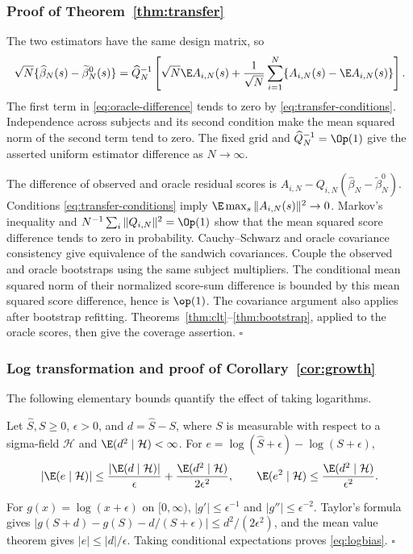 \subsubsection*{Proof of Theorem~\ref{thm:transfer}}
The two estimators have the same design matrix, so
\begin{equation}\label{eq:oracle-difference}
 \sqrt N\{\widehat\beta_N(s)-\widetilde\beta_N^0(s)\}
 =\widehat Q_N^{-1}\left[
 \sqrt N\E A_{i,N}(s)+\frac1{\sqrt N}
 \sum_{i=1}^N\{A_{i,N}(s)-\E A_{i,N}(s)\}\right].
\end{equation}
The first term in \eqref{eq:oracle-difference} tends to zero by \eqref{eq:transfer-conditions}. Independence across subjects and its second condition make the mean squared norm of the second term tend to zero. The fixed grid and $\widehat Q_N^{-1}=\Op(1)$ give the asserted uniform estimator difference as $N\to\infty$.

The difference of observed and oracle residual scores is $A_{i,N}-Q_{i,N}(\widehat\beta_N-\widetilde\beta_N^0)$. Conditions \eqref{eq:transfer-conditions} imply $\E\max_s\|A_{i,N}(s)\|^2\to0$. Markov's inequality and $N^{-1}\sum_i\|Q_{i,N}\|^2=\Op(1)$ show that the mean squared score difference tends to zero in probability. Cauchy--Schwarz and oracle covariance consistency give equivalence of the sandwich covariances. Couple the observed and oracle bootstraps using the same subject multipliers. The conditional mean squared norm of their normalized score-sum difference is bounded by this mean squared score difference, hence is $\op(1)$. The covariance argument also applies after bootstrap refitting. Theorems~\ref{thm:clt}--\ref{thm:bootstrap}, applied to the oracle scores, then give the coverage assertion. \hfill$\square$

\subsubsection*{Log transformation and proof of Corollary~\ref{cor:growth}}
The following elementary bounds quantify the effect of taking logarithms.

\begin{lemma}\label{lem:logbias}
Let $\widehat S,S\geq0$, $\epsilon>0$, and $d=\widehat S-S$, where $S$ is measurable with respect to a sigma-field $\mathcal H$ and $\E(d^2\mid\mathcal H)<\infty$. For $e=\log(\widehat S+\epsilon)-\log(S+\epsilon)$,
\begin{equation}\label{eq:logbias}
 |\E(e\mid\mathcal H)|
 \leq\frac{|\E(d\mid\mathcal H)|}{\epsilon}
       +\frac{\E(d^2\mid\mathcal H)}{2\epsilon^2},
 \qquad
 \E(e^2\mid\mathcal H)\leq\frac{\E(d^2\mid\mathcal H)}{\epsilon^2}.
\end{equation}
\end{lemma}
For $g(x)=\log(x+\epsilon)$ on $[0,\infty)$, $|g'|\leq\epsilon^{-1}$ and $|g''|\leq\epsilon^{-2}$. Taylor's formula gives $|g(S+d)-g(S)-d/(S+\epsilon)|\leq d^2/(2\epsilon^2)$, and the mean value theorem gives $|e|\leq|d|/\epsilon$. Taking conditional expectations proves \eqref{eq:logbias}. \hfill$\square$

